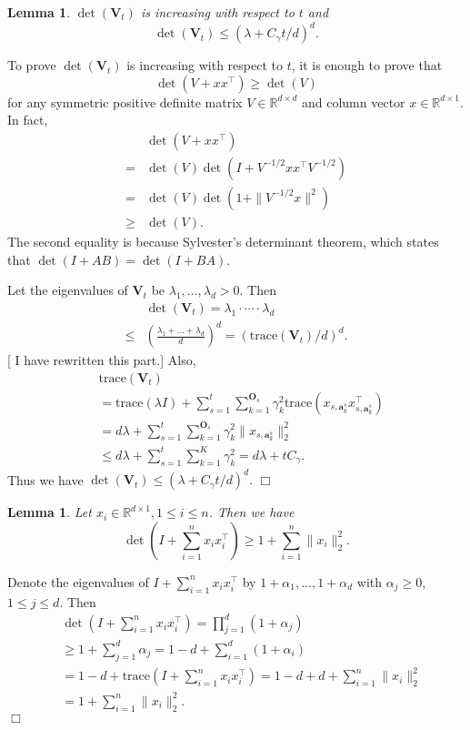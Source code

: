 \documentclass{article}
\newcommand{\RR}{\mathbb{R}}
\newcommand{\ba}{\mathbf{a}}
\newcommand{\bO}{\mathbf{O}}
\newcommand{\bV}{\mathbf{V}}
\newcommand{\trace}{\mathrm{trace}}
\newcommand{\norm}[1]{\| #1 \|}
\newtheorem{lemma}[theorem]{Lemma}%
\newenvironment{proof}{\noindent {\textbf{Proof. }}}{$\Box$ \medskip}
\newcommand{\wei}[1]{}
\newcommand{\wei}[1]{{\color{blue!50!black}  [\text{Wei:} #1]}}
\newcommand{\shuai}[1]{{\color{brown!60!black} [\text{Shuai:} #1]}}
\begin{document}
\begin{lemma} %
\label{lem:detVt}
$\det(\bV_t)$ is increasing with respect to $t$ and 
$$
\det(\bV_t) \leq (\lambda + C_\gamma t/d)^d.
$$
\end{lemma}
\begin{proof}
To prove $\det(\bV_t)$ is increasing with respect to $t$, it is enough to prove that
$$
\det(V + xx^{\top}) \geq \det(V)
$$
for any symmetric positive definite matrix $V \in \RR^{d \times d}$ and column vector $x \in \RR^{d\times 1}$. In fact,
\begin{align*}
&\det(V + xx^{\top}) \\
=& \det(V) \det(I + V^{-1/2}x x^{\top} V^{-1/2})\\
=& \det(V) \det(1 + \norm{V^{-1/2}x}^2)\\
\geq &\det(V).
\end{align*}
The second equality is because Sylvester's determinant theorem, which states that $\det(I + AB) = \det(I +BA)$.

Let the eigenvalues of $\bV_t$ be $\lambda_1, \ldots, \lambda_d > 0$. Then
\begin{align*}
&\det(\bV_t) = \lambda_1 \cdot \cdots \cdot \lambda_d \\
\leq & \left( \frac{\lambda_1 + \ldots + \lambda_d}{d} \right)^d = (\trace(\bV_t)/d)^d.
\end{align*}
\wei{Why? need a citation?} \shuai{I have rewritten this part.}
Also,
\begin{align*}
&\trace(\bV_t)\\
& = \trace(\lambda I) + \sum_{s=1}^t \sum_{k=1}^{\bO_s} \gamma_k^2 \trace(x_{s,\ba_k^s} x_{s,\ba_k^s}^{\top})\\	
& = d \lambda + \sum_{s=1}^t \sum_{k=1}^{\bO_s} \gamma_k^2 \norm{x_{s,\ba_k^s}}_2^2\\
& \leq d \lambda + \sum_{s=1}^t\sum_{k=1}^{K}\gamma_k^2 = d \lambda + t C_\gamma.
\end{align*}
Thus we have $\det(\bV_t) \leq (\lambda + C_\gamma t/d)^d.$
\end{proof}

\begin{lemma}
\label{lem:SumXiEstimateInDet}
Let $x_i \in \RR^{d \times 1}, 1 \leq i \leq n$. Then we have
$$
\det(I + \sum_{i=1}^n x_i x_i^{\top}) \geq 1 + \sum_{i=1}^n \norm{x_i}_2^2.
$$
\end{lemma}
\begin{proof}
Denote the eigenvalues of $I + \sum_{i=1}^n x_i x_i^{\top}$ by $1+\alpha_1,...,1+\alpha_d$ with $\alpha_j \geq 0$, $1\leq j\leq d$. Then
\begin{align*}
&\det(I + \sum_{i=1}^n x_i x_i^{\top})= \prod_{j=1}^d (1 + \alpha_j)\\
&\geq 1 +\sum_{j=1}^d \alpha_j =1-d + \sum_{i=1}^d (1+\alpha_i) \\
&=1-d + \trace(I + \sum_{i=1}^n x_i x_i^{\top})= 1-d + d + \sum_{i=1}^n \norm{x_i}_2^2\\
&=1 + \sum_{i=1}^n \norm{x_i}_2^2.
\end{align*}
\end{proof}
\end{document}
